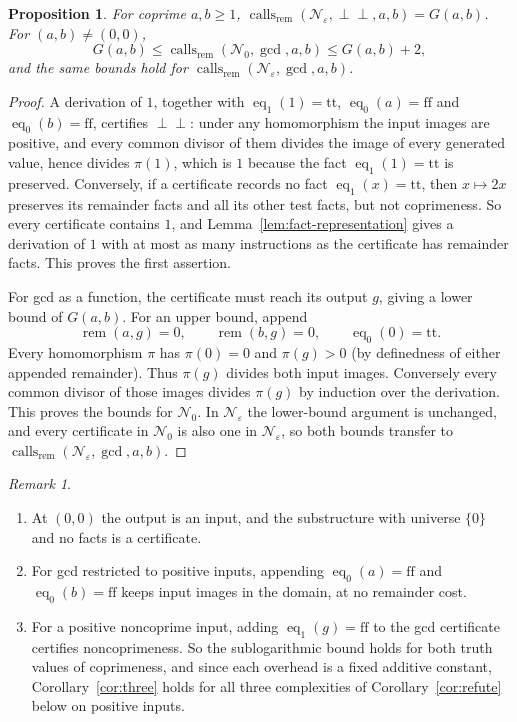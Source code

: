 \documentclass[11pt]{article}
\newtheorem{proposition}[theorem]{Proposition}
\theoremstyle{remark}
\newtheorem{remark}[theorem]{Remark}
\newcommand{\rem}{\operatorname{rem}}
\newcommand{\calls}{\operatorname{calls}}
\newcommand{\eq}{\operatorname{eq}}
\newcommand{\coprime}{\perp\!\!\!\perp}
\begin{document}
\begin{proposition}\label{prop:certificates}
For coprime $a,b\geq1$,
$\calls_{\rem}(\mathcal N_\varepsilon,\coprime,a,b)=G(a,b)$. For
$(a,b)\neq(0,0)$,
\[
G(a,b)\leq\calls_{\rem}(\mathcal N_0,\gcd,a,b)\leq G(a,b)+2,
\]
and the same bounds hold for $\calls_{\rem}(\mathcal N_\varepsilon,\gcd,a,b)$.
\end{proposition}
\begin{proof}
A derivation of $1$, together with $\eq_1(1)=\mathrm{tt}$,
$\eq_0(a)=\mathrm{ff}$ and $\eq_0(b)=\mathrm{ff}$, certifies $\coprime$: under
any homomorphism the input images are positive, and every common divisor of
them divides the image of every generated value, hence divides $\pi(1)$,
which is $1$ because the fact $\eq_1(1)=\mathrm{tt}$ is preserved.
Conversely, if a certificate records no fact $\eq_1(x)=\mathrm{tt}$, then
$x\mapsto2x$ preserves its remainder facts and all its other test facts,
but not coprimeness. So every certificate contains $1$, and
Lemma~\ref{lem:fact-representation} gives a derivation of $1$ with at
most as many instructions as the certificate has remainder facts. This
proves the first assertion.

For gcd as a function, the certificate must reach its output $g$, giving a
lower bound of $G(a,b)$. For an upper bound, append
\[
\rem(a,g)=0,\qquad \rem(b,g)=0,\qquad \eq_0(0)=\mathrm{tt}.
\]
Every homomorphism $\pi$ has $\pi(0)=0$ and
$\pi(g)>0$ (by definedness of either appended remainder). Thus $\pi(g)$
divides both input images. Conversely every common divisor of those images
divides $\pi(g)$ by induction over the derivation. This proves the bounds
for $\mathcal N_0$. In $\mathcal N_\varepsilon$ the lower-bound argument is
unchanged, and every certificate in $\mathcal N_0$ is also one in
$\mathcal N_\varepsilon$, so both bounds transfer to
$\calls_{\rem}(\mathcal N_\varepsilon,\gcd,a,b)$.
\end{proof}
\begin{remark}\label{rem:noncoprime}
\begin{enumerate}
\item At $(0,0)$ the output is an input, and the substructure with universe
$\{0\}$ and no facts is a certificate.
\item For gcd restricted to positive inputs, appending $\eq_0(a)=\mathrm{ff}$
and $\eq_0(b)=\mathrm{ff}$ keeps input images in the domain, at no
remainder cost.
\item For a positive noncoprime input, adding $\eq_1(g)=\mathrm{ff}$ to the
gcd certificate certifies noncoprimeness. So the sublogarithmic bound holds
for both truth values of coprimeness, and since each overhead is a fixed
additive constant, Corollary~\ref{cor:three} holds for all three complexities
of Corollary~\ref{cor:refute} below on positive inputs.
\end{enumerate}
\end{remark}
\end{document}

